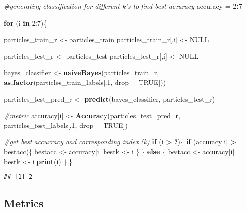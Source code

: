 \documentclass[
]{article}
\newenvironment{Shaded}{\begin{snugshade}}{\end{snugshade}}
\newcommand{\CommentTok}[1]{\textcolor[rgb]{0.56,0.35,0.01}{\textit{#1}}}
\newcommand{\ControlFlowTok}[1]{\textcolor[rgb]{0.13,0.29,0.53}{\textbf{#1}}}
\newcommand{\DataTypeTok}[1]{\textcolor[rgb]{0.13,0.29,0.53}{#1}}
\newcommand{\DecValTok}[1]{\textcolor[rgb]{0.00,0.00,0.81}{#1}}
\newcommand{\KeywordTok}[1]{\textcolor[rgb]{0.13,0.29,0.53}{\textbf{#1}}}
\newcommand{\NormalTok}[1]{#1}
\newcommand{\OperatorTok}[1]{\textcolor[rgb]{0.81,0.36,0.00}{\textbf{#1}}}
\newcommand{\OtherTok}[1]{\textcolor[rgb]{0.56,0.35,0.01}{#1}}
\newcommand{\StringTok}[1]{\textcolor[rgb]{0.31,0.60,0.02}{#1}}
\begin{document}
\begin{Shaded}
\begin{Highlighting}[]
\CommentTok{#generating classification for different k's to find best accuracy}
\NormalTok{accuracy =}\StringTok{ }\DecValTok{2}\OperatorTok{:}\DecValTok{7}

\ControlFlowTok{for}\NormalTok{ (i }\ControlFlowTok{in} \DecValTok{2}\OperatorTok{:}\DecValTok{7}\NormalTok{)\{}

\NormalTok{ particles_train_r <-}\StringTok{ }\NormalTok{particles_train}
\NormalTok{ particles_train_r[,i] <-}\StringTok{ }\OtherTok{NULL}

\NormalTok{ particles_test_r <-}\StringTok{ }\NormalTok{particles_test}
\NormalTok{ particles_test_r[,i] <-}\StringTok{ }\OtherTok{NULL}

 
\NormalTok{  bayes_classifier <-}\StringTok{ }\KeywordTok{naiveBayes}\NormalTok{(particles_train_r, }\KeywordTok{as.factor}\NormalTok{(particles_train_labels[,}\DecValTok{1}\NormalTok{, }\DataTypeTok{drop =} \OtherTok{TRUE}\NormalTok{]))}

\NormalTok{  particles_test_pred_r <-}\StringTok{ }\KeywordTok{predict}\NormalTok{(bayes_classifier, particles_test_r)}
    
  \CommentTok{#metric}
\NormalTok{  accuracy[i] <-}\StringTok{ }\KeywordTok{Accuracy}\NormalTok{(particles_test_pred_r, particles_test_labels[,}\DecValTok{1}\NormalTok{, }\DataTypeTok{drop =} \OtherTok{TRUE}\NormalTok{])}

\CommentTok{#get best accurracy and corresponding index (k)}
  \ControlFlowTok{if}\NormalTok{ (i }\OperatorTok{>}\StringTok{ }\DecValTok{2}\NormalTok{)\{}
    \ControlFlowTok{if}\NormalTok{ (accuracy[i] }\OperatorTok{>}\StringTok{ }\NormalTok{bestacc)\{}
\NormalTok{      bestacc <-}\StringTok{ }\NormalTok{accuracy[i]}
\NormalTok{      bestk <-}\StringTok{ }\NormalTok{i}
\NormalTok{    \}}
\NormalTok{  \} }\ControlFlowTok{else}\NormalTok{ \{}
\NormalTok{    bestacc <-}\StringTok{ }\NormalTok{accuracy[i]}
\NormalTok{    bestk <-}\StringTok{ }\NormalTok{i}
    \KeywordTok{print}\NormalTok{(i)}
\NormalTok{  \}}
\NormalTok{\}}
\end{Highlighting}
\end{Shaded}

\begin{verbatim}
## [1] 2
\end{verbatim}

\hypertarget{metrics-3}{%
\subsection{Metrics}\label{metrics-3}}
\end{document}
